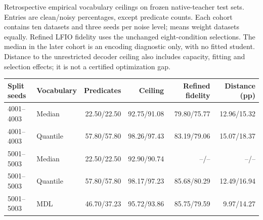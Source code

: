 \begin{kbtable}
\centering
\caption{Retrospective empirical vocabulary ceilings on frozen native-teacher test sets. Entries are clean/noisy percentages, except predicate counts. Each cohort contains ten datasets and three seeds per noise level; means weight datasets equally. Refined LFIO fidelity uses the unchanged eight-condition selections. The median in the later cohort is an encoding diagnostic only, with no fitted student. Distance to the unrestricted decoder ceiling also includes capacity, fitting and selection effects; it is not a certified optimization gap.}
\label{tab:vocabulary_ceiling}
\small
\begin{adjustbox}{max width=\linewidth}
\begin{tabular}{llrrrr}
\toprule
Split seeds & Vocabulary & Predicates & Ceiling & Refined fidelity & Distance (pp) \\
\midrule
4001--4003 & Median & 22.50/22.50 & 92.75/91.08 & 79.80/75.77 & 12.96/15.32 \\
4001--4003 & Quantile & 57.80/57.80 & 98.26/97.43 & 83.19/79.06 & 15.07/18.37 \\
5001--5003 & Median & 22.50/22.50 & 92.90/90.74 & --/-- & --/-- \\
5001--5003 & Quantile & 57.80/57.80 & 98.17/97.23 & 85.68/80.29 & 12.49/16.94 \\
5001--5003 & MDL & 46.70/37.23 & 95.72/93.86 & 85.75/79.59 & 9.97/14.27 \\
\bottomrule
\end{tabular}
\end{adjustbox}
\end{kbtable}

